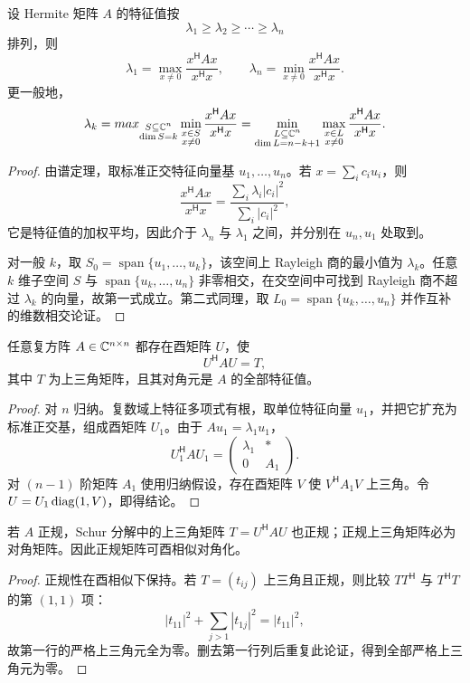 \begin{theorem}
设 Hermite 矩阵 $A$ 的特征值按
\[
\lambda_1\ge\lambda_2\ge\cdots\ge\lambda_n
\]
排列，则
\[
\lambda_1=\max_{x\ne0}\frac{x^{\mathsf H}Ax}{x^{\mathsf H}x},
\qquad
\lambda_n=\min_{x\ne0}\frac{x^{\mathsf H}Ax}{x^{\mathsf H}x}.
\]
更一般地，
\[
\lambda_k=max_{\substack{S\subseteq\mathbb{C}^n\\\dim S=k}}
\min_{\substack{x\in S\\x\ne0}}
\frac{x^{\mathsf H}Ax}{x^{\mathsf H}x}
=
\min_{\substack{L\subseteq\mathbb{C}^n\\\dim L=n-k+1}}
\max_{\substack{x\in L\\x\ne0}}
\frac{x^{\mathsf H}Ax}{x^{\mathsf H}x}.
\]
\end{theorem}
\begin{proof}
由谱定理，取标准正交特征向量基 $u_1,\ldots,u_n$。若
$x=\sum_i c_iu_i$，则
\[
\frac{x^{\mathsf H}Ax}{x^{\mathsf H}x}
=\frac{\sum_i\lambda_i|c_i|^2}{\sum_i|c_i|^2},
\]
它是特征值的加权平均，因此介于 $\lambda_n$ 与 $\lambda_1$ 之间，并分别在
$u_n,u_1$ 处取到。

对一般 $k$，取 $S_0=\operatorname{span}\{u_1,\ldots,u_k\}$，该空间上 Rayleigh 商的最小值为 $\lambda_k$。任意 $k$ 维子空间 $S$ 与
$\operatorname{span}\{u_k,\ldots,u_n\}$ 非零相交，在交空间中可找到 Rayleigh 商不超过 $\lambda_k$ 的向量，故第一式成立。第二式同理，取
$L_0=\operatorname{span}\{u_k,\ldots,u_n\}$ 并作互补的维数相交论证。
\end{proof}

\begin{theorem}
任意复方阵 $A\in\mathbb{C}^{n\times n}$ 都存在酉矩阵 $U$，使
\[
U^{\mathsf H}AU=T,
\]
其中 $T$ 为上三角矩阵，且其对角元是 $A$ 的全部特征值。
\end{theorem}
\begin{proof}
对 $n$ 归纳。复数域上特征多项式有根，取单位特征向量 $u_1$，并把它扩充为标准正交基，组成酉矩阵 $U_1$。由于 $Au_1=\lambda_1u_1$，
\[
U_1^{\mathsf H}AU_1=
\begin{pmatrix}
\lambda_1&*\\0&A_1
\end{pmatrix}.
\]
对 $(n-1)$ 阶矩阵 $A_1$ 使用归纳假设，存在酉矩阵 $V$ 使
$V^{\mathsf H}A_1V$ 上三角。令
$U=U_1\operatorname{diag}(1,V)$，即得结论。
\end{proof}

\begin{corollary}[正规矩阵为何可酉对角化]
若 $A$ 正规，Schur 分解中的上三角矩阵 $T=U^{\mathsf H}AU$ 也正规；正规上三角矩阵必为对角矩阵。因此正规矩阵可酉相似对角化。
\end{corollary}
\begin{proof}
正规性在酉相似下保持。若 $T=(t_{ij})$ 上三角且正规，则比较
$TT^{\mathsf H}$ 与 $T^{\mathsf H}T$ 的第 $(1,1)$ 项：
\[
|t_{11}|^2+\sum_{j>1}|t_{1j}|^2=|t_{11}|^2,
\]
故第一行的严格上三角元全为零。删去第一行列后重复此论证，得到全部严格上三角元为零。
\end{proof}


